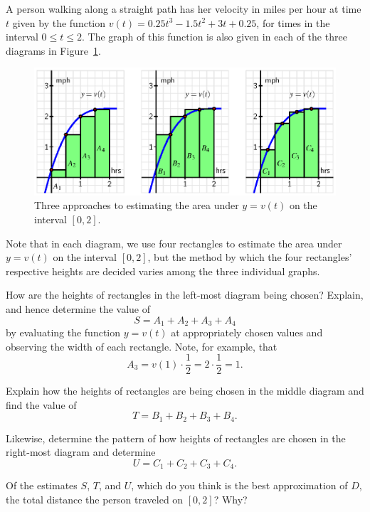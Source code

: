 \begin{pa} \label{PA:4.2}
A person walking along a straight path has her velocity in miles per hour at time $t$ given by the function $v(t) = 0.25t^3-1.5t^2+3t+0.25$, for times in the interval $0 \le t \le 2$.  The graph of this function is also given in each of the three diagrams in Figure~\ref{F:4.2.PA1}.
\begin{figure}[h]
\begin{center}
\includegraphics{figures/4_2_PA1.eps}
\end{center}
\caption{Three approaches to estimating the area under $y = v(t)$ on the interval $[0,2]$.} \label{F:4.2.PA1}
\end{figure}
Note that in each diagram, we use four rectangles to estimate the area under $y = v(t)$ on the interval $[0,2]$, but the method by which the four rectangles' respective heights are decided varies among the three individual graphs.
\ba
	\item How are the heights of rectangles in the left-most diagram being chosen?  Explain, and hence determine the value of 
	$$S = A_1 + A_2 + A_3 + A_4$$
	by evaluating the function $y = v(t)$ at appropriately chosen values and observing the width of each rectangle.  Note, for example, that 
	$$A_3 = v(1) \cdot \frac{1}{2} = 2 \cdot \frac{1}{2} = 1.$$
	\item Explain how the heights of rectangles are being chosen in the middle diagram and find the value of
	$$T = B_1 + B_2 + B_3 + B_4.$$
	\item Likewise, determine the pattern of how heights of rectangles are chosen in the right-most diagram and determine
	$$U = C_1 + C_2 + C_3 + C_4.$$
	
	\item Of the estimates $S$, $T$, and $U$, which do you think is the best approximation of $D$, the total distance the person traveled on $[0,2]$?  Why?
\ea
\end{pa} 
\afterpa